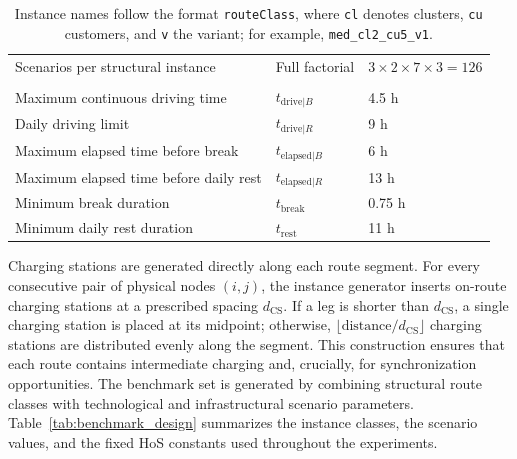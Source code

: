 \documentclass[3p,11pt,authoryear]{elsarticle}  %
\begin{document}
\begin{table}[!htbp]
\begin{tabular}{@{}lll@{}}
Scenarios per structural instance & Full factorial & \(3\times2\times7\times3=126\) \\
\addlinespace
\multicolumn{3}{@{}l}{\textit{Fixed HoS parameters}} \\
Maximum continuous driving time & \(t_{\text{drive}|B}\) & 4.5 h \\
Daily driving limit & \(t_{\text{drive}|R}\) & 9 h \\
Maximum elapsed time before break & \(t_{\text{elapsed}|B}\) & 6 h \\
Maximum elapsed time before daily rest & \(t_{\text{elapsed}|R}\) & 13 h \\
Minimum break duration & \(t_{\text{break}}\) & 0.75 h \\
Minimum daily rest duration & \(t_{\text{rest}}\) & 11 h \\
\bottomrule
\end{tabular}
\caption*{\footnotesize Instance names follow the format \texttt{routeClass}, where \texttt{cl} denotes clusters, \texttt{cu} customers, and \texttt{v} the variant; for example, \texttt{med\_cl2\_cu5\_v1}.}
\end{table}

Charging stations are generated directly along each route segment. For every consecutive pair of physical nodes \((i,j)\), the instance generator inserts on-route charging stations at a prescribed spacing \(d_{\text{CS}}\). If a leg is shorter than \(d_{\text{CS}}\), a single charging station is placed at its midpoint; otherwise, \(\lfloor \text{distance}/d_{\text{CS}} \rfloor\) charging stations are distributed evenly along the segment. This construction ensures that each route contains intermediate charging and, crucially, for synchronization opportunities. The benchmark set is generated by combining structural route classes with technological and infrastructural scenario parameters. Table~\ref{tab:benchmark_design} summarizes the instance classes, the scenario values, and the fixed HoS constants used throughout the experiments. 




\end{document}
